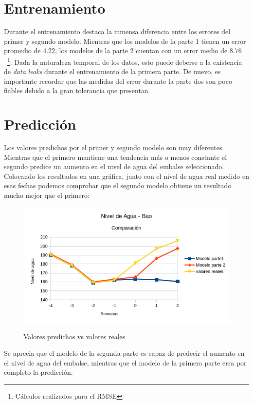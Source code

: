 \documentclass[12pt]{report} %
\begin{document}
\section{Entrenamiento}

Durante el entrenamiento destaca la inmensa diferencia entre los errores del primer y segundo modelo. Mientras que los modelos de la parte 1 tienen un error promedio de $4.22$, los modelos de la parte 2 cuentan con un error medio de $8.76$~\footnote{Cálculos realizados para el RMSE}. Dada la naturaleza temporal de los datos, esto puede deberse a la existencia de \textit{data leaks} durante el entrenamiento de la primera parte. De nuevo, es importante recordar que las medidas del error durante la parte dos son poco fiables debido a la gran tolerancia que presentan.

\section{Predicción}

Los valores predichos por el primer y segundo modelo son muy diferentes. Mientras que el primero mantiene una tendencia más o menos constante el segundo predice un aumento en el nivel de agua del embalse seleccionado. Colocando los resultados en una gráfica, junto con el nivel de agua real medido en esas fechas podemos comprobar que el segundo modelo obtiene un resultado mucho mejor que el primero:

\begin{figure}[H]
    \includegraphics[width=0.85\linewidth]{predict-12-real.png}\\
    \caption{\small Valores predichos vs valores reales}
\end{figure}

Se aprecia que el modelo de la segunda parte es capaz de predecir el aumento en el nivel de agua del embalse, mientras que el modelo de la primera parte erra por completo la predicción.
\end{document}
